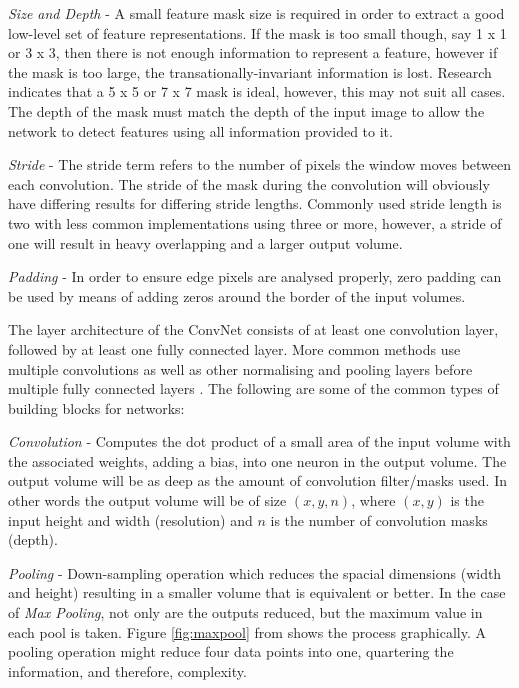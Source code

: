 \documentclass[fleqn,twoside,12pt]{report}
\begin{document}
\textit{Size and Depth} - A small feature mask size is required in order to extract a good low-level set of feature representations. If the mask is too small though, say 1 x 1 or 3 x 3, then there is not enough information to represent a feature, however if the mask is too large, the transationally-invariant information is lost. Research indicates that a 5 x 5 or 7 x 7 mask is ideal, however, this may not suit all cases. The depth of the mask must match the depth of the input image to allow the network to detect features using all information provided to it.

\textit{Stride} - The stride term refers to the number of pixels the window moves between each convolution. The stride of the mask during the convolution will obviously have differing results for differing stride lengths. Commonly used stride length is two with less common implementations using three or more, however, a stride of one will result in heavy overlapping and a larger output volume.

\textit{Padding} - In order to ensure edge pixels are analysed properly, zero padding can be used by means of adding zeros around the border of the input volumes.  

The layer architecture of the ConvNet consists of at least one convolution layer, followed by at least one fully connected layer. More common methods use multiple convolutions as well as other normalising and pooling layers before multiple fully connected layers \cite{krizhevsky,ciresan}. The following are some of the common types of building blocks for networks: 

\textit{Convolution} - Computes the dot product of a small area of the input volume with the associated weights, adding a bias, into one neuron in the output volume. The output volume will be as deep as the amount of convolution filter/masks used. In other words the output volume will be of size $(x,y,n)$, where $(x,y)$ is the input height and width (resolution) and $n$ is the number of convolution masks (depth).

\textit{Pooling} - Down-sampling operation which reduces the spacial dimensions (width and height) resulting in a smaller volume that is equivalent or better. In the case of \textit{Max Pooling}, not only are the outputs reduced, but the maximum value in each pool is taken. Figure \ref{fig:maxpool} from \cite{andrej}shows the process graphically. A pooling operation might reduce four data points into one, quartering the information, and therefore, complexity.
\end{document}

